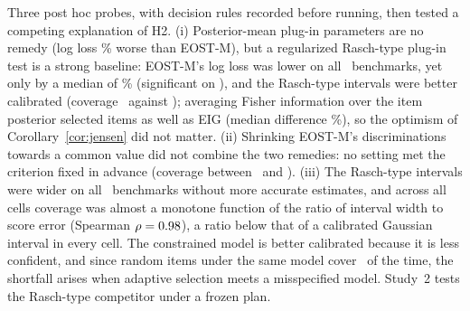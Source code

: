 Three post hoc probes, with decision rules recorded before running, then tested a competing
explanation of H2. (i) Posterior-mean plug-in parameters are no remedy (log loss
\PhMfieapLLNeightAbs\% worse than EOST-M), but a regularized Rasch-type plug-in test is a
strong baseline: EOST-M's log loss was lower on all \PhMfioneprLLNeightB\ benchmarks, yet only
by a median of \PhMfioneprLLNeightAbs\% (significant on \PhMfioneprLLNeightFav), and the
Rasch-type intervals were better calibrated (coverage \PhCovMfionepr\ against \PhCovEigmg);
averaging Fisher information over the item posterior selected items as well as EIG (median
difference \PhEfiLLNeightAbs\%), so the optimism of Corollary~\ref{cor:jensen} did not
matter. (ii) Shrinking EOST-M's discriminations towards a common value did not combine the
two remedies: no setting met the criterion fixed in advance (coverage between \ShrMgCovMin\
and \ShrMgCovMax). (iii) The Rasch-type intervals were wider on all \PhThreeWiderBanks\
benchmarks without more accurate estimates, and across all cells coverage was almost a
monotone function of the ratio of interval width to score error (Spearman $\rho=0.98$),
a ratio below that of a calibrated Gaussian interval in every cell. The constrained model is
better calibrated because it is less confident, and since random items under the same model
cover \CovRandmg\ of the time, the shortfall arises when adaptive selection meets a
misspecified model. Study~2 tests the Rasch-type competitor under a frozen plan.
